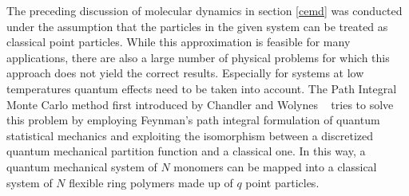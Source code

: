 The preceding discussion of molecular dynamics in section \ref{cemd} was conducted under the assumption that the particles in the given system can be treated as classical point particles. While this approximation is feasible for many applications, there are also a large number of physical problems for which this approach does not yield the correct results. Especially for systems at low temperatures quantum effects need to be taken into account. The Path Integral Monte Carlo method first introduced by Chandler and Wolynes ~\cite{Chandler1980} tries to solve this problem by employing Feynman's path integral formulation of quantum statistical mechanics and exploiting the isomorphism between a discretized quantum mechanical partition function and a classical one. In this way, a quantum mechanical system of $N$ monomers can be mapped into a classical system of $N$ flexible ring polymers made up of $q$ point particles. 

